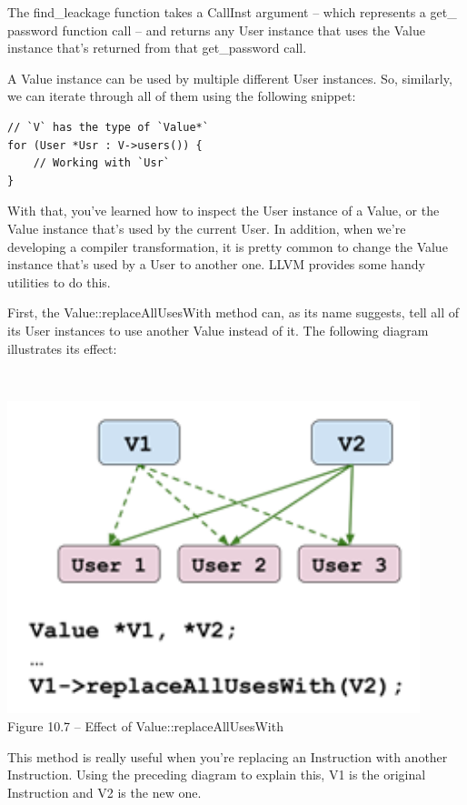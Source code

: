 The find\_leackage function takes a CallInst argument – which represents a get\_ password function call – and returns any User instance that uses the Value instance that's returned from that get\_password call.

A Value instance can be used by multiple different User instances. So, similarly, we can iterate through all of them using the following snippet:

\begin{lstlisting}[style=styleCXX]
// `V` has the type of `Value*`
for (User *Usr : V->users()) {
	// Working with `Usr`
}
\end{lstlisting}

With that, you've learned how to inspect the User instance of a Value, or the Value instance that's used by the current User. In addition, when we're developing a compiler transformation, it is pretty common to change the Value instance that's used by a User to another one. LLVM provides some handy utilities to do this.

First, the Value::replaceAllUsesWith method can, as its name suggests, tell all of its User instances to use another Value instead of it. The following diagram illustrates its effect:

\hspace*{\fill} \\ %
\begin{center}
\includegraphics[width=0.9\textwidth]{content/3/chapter10/images/7.png}\\
Figure 10.7 – Effect of Value::replaceAllUsesWith
\end{center}

This method is really useful when you're replacing an Instruction with another Instruction. Using the preceding diagram to explain this, V1 is the original Instruction and V2 is the new one.

